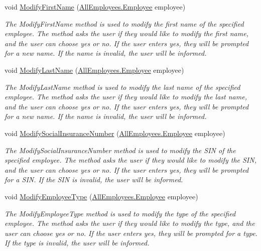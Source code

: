 \begin{DoxyCompactItemize}
void \hyperlink{class_the_company_1_1_container_a4a7d1fc143b5508d5d75bf3f273efcc2}{Modify\+First\+Name} (\hyperlink{class_all_employees_1_1_employee}{All\+Employees.\+Employee} employee)
\begin{DoxyCompactList}\small\item\em The Modify\+First\+Name method is used to modify the first name of the specified employee. The method asks the user if they would like to modify the first name, and the user can choose yes or no. If the user enters yes, they will be prompted for a new name. If the name is invalid, the user will be informed. \end{DoxyCompactList}\item 
void \hyperlink{class_the_company_1_1_container_a2e47d1205452ecb352ea6609e0cddcc5}{Modify\+Last\+Name} (\hyperlink{class_all_employees_1_1_employee}{All\+Employees.\+Employee} employee)
\begin{DoxyCompactList}\small\item\em The Modify\+Last\+Name method is used to modify the last name of the specified employee. The method asks the user if they would like to modify the last name, and the user can choose yes or no. If the user enters yes, they will be prompted for a new name. If the name is invalid, the user will be informed. \end{DoxyCompactList}\item 
void \hyperlink{class_the_company_1_1_container_ac58d486919a05c5940937c8b3e29cb38}{Modify\+Social\+Insurance\+Number} (\hyperlink{class_all_employees_1_1_employee}{All\+Employees.\+Employee} employee)
\begin{DoxyCompactList}\small\item\em The Modify\+Social\+Insurance\+Number method is used to modify the S\+I\+N of the specified employee. The method asks the user if they would like to modify the S\+I\+N, and the user can choose yes or no. If the user enters yes, they will be prompted for a S\+I\+N. If the S\+I\+N is invalid, the user will be informed. \end{DoxyCompactList}\item 
void \hyperlink{class_the_company_1_1_container_a6acf243566f6ef9fddbd7e5487bae64a}{Modify\+Employee\+Type} (\hyperlink{class_all_employees_1_1_employee}{All\+Employees.\+Employee} employee)
\begin{DoxyCompactList}\small\item\em The Modify\+Employee\+Type method is used to modify the type of the specified employee. The method asks the user if they would like to modify the type, and the user can choose yes or no. If the user enters yes, they will be prompted for a type. If the type is invalid, the user will be informed. \end{DoxyCompactList}\item 

\end{DoxyCompactItemize}
